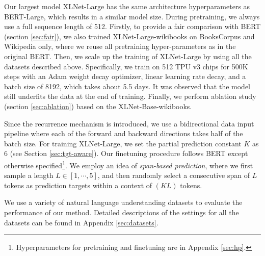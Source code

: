 \documentclass{article}
\begin{document}
Our largest model XLNet-Large has the same architecture hyperparameters as BERT-Large, which results in a similar model size.
During pretraining, we always use a full sequence length of 512.
Firstly, to provide a fair comparison with BERT (section \ref{sec:fair}), we also trained XLNet-Large-wikibooks on BooksCorpus and Wikipedia only, where we reuse all pretraining hyper-parameters as in the original BERT.
Then, we scale up the training of XLNet-Large by using all the datasets described above.
Specifically, we train on 512 TPU v3 chips for 500K steps with an Adam weight decay optimizer, linear learning rate decay, and a batch size of 8192, which takes about 5.5 days. 
It was observed that the model still underfits the data at the end of training.
Finally, we perform ablation study (section \ref{sec:ablation}) based on the XLNet-Base-wikibooks.


Since the recurrence mechanism is introduced, we use a bidirectional data input pipeline where each of the forward and backward directions takes half of the batch size. 
For training XLNet-Large, we set the partial prediction constant $K$ as 6 (see Section \ref{sec:tgt-aware}).
Our finetuning procedure follows BERT \cite{devlin2018bert} except otherwise specified\footnote{Hyperparameters for pretraining and finetuning are in Appendix \ref{sec:hp}.}.
We employ an idea of \textit{span-based prediction}, where we first sample a length $L \in [1, \cdots, 5]$, and then randomly select a consecutive span of $L$ tokens as prediction targets within a context of $(K L)$ tokens.

We use a variety of natural language understanding datasets to evaluate the performance of our method. Detailed descriptions of the settings for all the datasets can be found in Appendix \ref{sec:datasets}.
\end{document}
